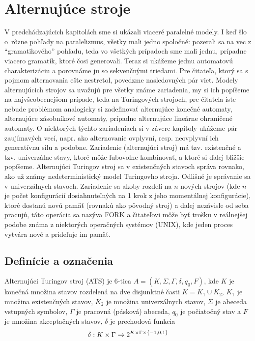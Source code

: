 \chapter{Alternujúce stroje}

V predchádzajúcich kapitolách sme si ukázali viaceré paralelné
modely. I keď šlo \mbox{o rôzne} pohľady na paralelizmus, všetky
mali jedno spoločné: pozerali sa na vec z ``gramatikového''
pohľadu, teda vo všetkých prípadoch sme mali jednu, prípadne
viacero gramatík, ktoré čosi generovali. Teraz si ukážeme jednu
automatovú charakterizáciu a porovnáme ju so sekvenčnými triedami.
Pre čitateľa, ktorý sa s pojmom alternovania ešte nestretol,
povedzme nasledovných pár viet. Modely alternujúcich strojov sa
uvažujú pre všetky známe zariadenia, my si ich popíšeme na
najvšeobecnejšom prípade, teda na Turingových strojoch, pre
čitateľa iste nebude problémom analogicky si zadefinovať
alternujúce konečné automaty, alternujúce zásobníkové automaty,
prípadne alternujúce lineárne ohraničené automaty. O niektorých
týchto zariadeniach si v závere kapitoly ukážeme pár zaujímavých
vecí, napr. ako alternovanie ovplyvní, resp. neovplyvní ich
generatívnu silu a podobne. Zariadenie (alternujúci stroj) má tzv.
existenčné a tzv. univerzálne stavy, ktoré môže ľubovoľne
kombinovať, a ktoré si ďalej bližšie popíšeme. Alternujúci
Turingov stroj sa v existenčných stavoch správa rovnako, ako už
známy nedeterministický model Turingovho stroja. Odlišné je
správanie sa v univerzálnych stavoch. Zariadenie sa akoby rozdelí
na $n$ nových strojov (kde $n$ je počet konfigurácií
dosiahnuteľných na 1 krok z jeho momentálnej konfigurácie), ktoré
dostanú novú pamäť (rovnakú ako pôvodný stroj) a ďalej nezávisle
od seba pracujú, táto operácia sa nazýva FORK a čitateľovi môže
byť trošku v reálnejšej podobe známa z niektorých operačných
systémov (UNIX), kde jeden proces vytvára nové a prideľuje im
pamäť.

\section{Definície a označenia}

\begin{definicia}
  Alternujúci Turingov stroj (ATS) je 6-tica
  $A=(K,\Sigma,\Gamma,\delta,q_0,F)$, kde $K$ je konečná množina
  stavov rozdelená na dve disjunktné časti $K=K_1\cup K_2$, $K_1$ je
  množina exis\-tenčných stavov, $K_2$ je množina univerzálnych
  stavov, $\Sigma$ je abeceda vstupných symbolov, $\Gamma$ je
  pracovná (pásková) abeceda, $q_0$ je počiatočný stav a $F$ je
  množina akceptačných stavov, $\delta$ je prechodová funkcia
  \[
  \delta:K\times\Gamma\rightarrow 2^{K\times\Gamma\times\{-1,0,1\}}
  \]
\end{definicia}

